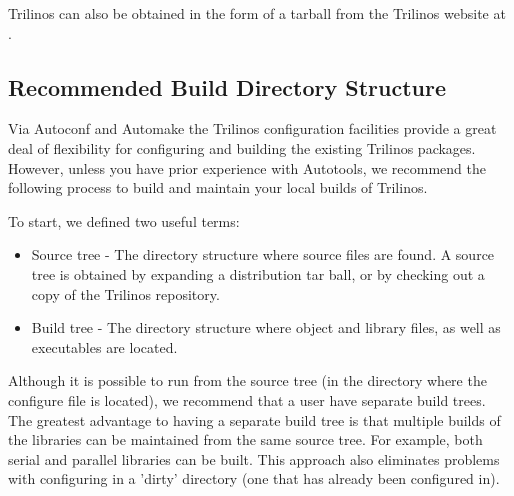 \documentclass[12pt,relax]{TrilinosDevGuide}
\begin{document}
Trilinos can also be obtained in the form of a tarball from the Trilinos 
website at 
.  

\subsection{Recommended Build Directory Structure}

Via Autoconf and Automake the Trilinos configuration facilities
provide a great deal of flexibility for configuring and building the
existing Trilinos packages.  However, unless you have prior experience
with Autotools, we recommend the following process to build and
maintain your local builds of Trilinos.

To start, we defined two useful terms:
\begin{itemize}
\item Source tree - The directory structure where source files are found.  A source 
tree is obtained by expanding a distribution tar ball, or by checking 
out a copy of the Trilinos repository.  
\item Build tree - The directory structure where object and library files, as well 
as executables are located.  
\end{itemize}
 
\begin{minipage}[c]{\textwidth}

\begin{minipage}[l]{.6\textwidth}

Although it is possible to run  from the source tree (in 
the directory where the configure file is located), we recommend that a 
user have separate build trees.  The greatest advantage to having a separate 
build tree is that multiple builds of the libraries can be maintained
from the same source tree.  For example, both serial and parallel libraries
can be built.  
This approach also eliminates problems with configuring in a 'dirty'
directory (one that has already been configured in).
\end{minipage}\hfill
{}
\end{minipage}
\end{document}
